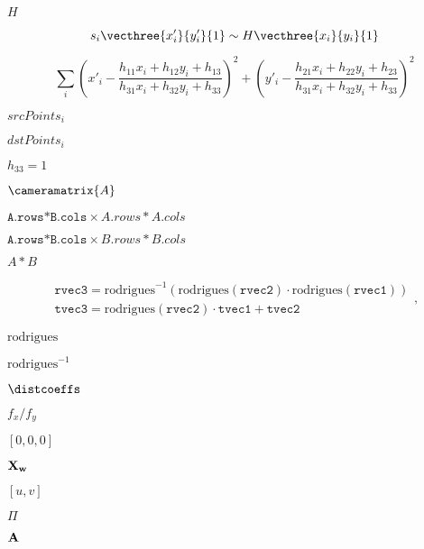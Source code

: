 \documentclass{article}
\begin{document}
$H$
\pagebreak

\[s_i \vecthree{x'_i}{y'_i}{1} \sim H \vecthree{x_i}{y_i}{1}\]
\pagebreak

\[\sum _i \left ( x'_i- \frac{h_{11} x_i + h_{12} y_i + h_{13}}{h_{31} x_i + h_{32} y_i + h_{33}} \right )^2+ \left ( y'_i- \frac{h_{21} x_i + h_{22} y_i + h_{23}}{h_{31} x_i + h_{32} y_i + h_{33}} \right )^2\]
\pagebreak

$srcPoints_i$
\pagebreak

$dstPoints_i$
\pagebreak

$h_{33}=1$
\pagebreak

$\cameramatrix{A}$
\pagebreak

$\texttt{A.rows*B.cols} \times {A.rows*A.cols}$
\pagebreak

$\texttt{A.rows*B.cols} \times {B.rows*B.cols}$
\pagebreak

$A*B$
\pagebreak

\[\begin{array}{l} \texttt{rvec3} = \mathrm{rodrigues} ^{-1} \left ( \mathrm{rodrigues} ( \texttt{rvec2} ) \cdot \mathrm{rodrigues} ( \texttt{rvec1} ) \right ) \\ \texttt{tvec3} = \mathrm{rodrigues} ( \texttt{rvec2} ) \cdot \texttt{tvec1} + \texttt{tvec2} \end{array} ,\]
\pagebreak

$\mathrm{rodrigues}$
\pagebreak

$\mathrm{rodrigues}^{-1}$
\pagebreak

$\distcoeffs$
\pagebreak

$f_x / f_y$
\pagebreak

$[0, 0, 0]$
\pagebreak

$ \bf{X}_w $
\pagebreak

$ \left[ u, v \right] $
\pagebreak

$ \Pi $
\pagebreak

$ \bf{A} $
\pagebreak
\end{document}
